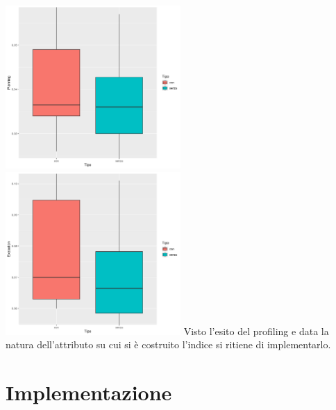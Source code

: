 \documentclass{article}
\begin{document}
\newline
\includegraphics[width=0.5\textwidth]{planning_progetto_budget_modifica.png}
\includegraphics[width=0.5\textwidth]{execution_progetto_budget_modifica.png}
\newline
\newline
Visto l'esito del profiling e data la natura dell'attributo su cui si è costruito l'indice si ritiene di implementarlo.
 
\newpage

\section{Implementazione}
\end{document}
